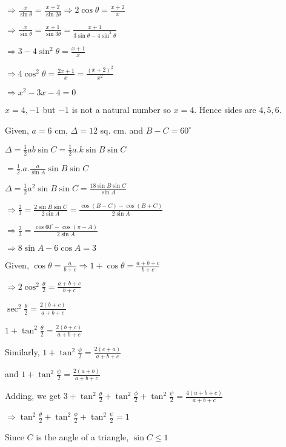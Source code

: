   $\Rightarrow \frac{x}{\sin\theta} = \frac{x + 2}{\sin2\theta} \Rightarrow 2\cos\theta = \frac{x + 2}{x}$

  $\Rightarrow \frac{x}{\sin\theta} = \frac{x + 1}{\sin3\theta} = \frac{x + 1}{3\sin\theta - 4\sin^2\theta}$

  $\Rightarrow 3 - 4\sin^2\theta = \frac{x + 1}{x}$

  $\Rightarrow 4\cos^2\theta = \frac{2x + 1}{x} = \frac{(x + 2)^2}{x^2}$

  $\Rightarrow x^2 - 3x - 4 = 0$

  $x = 4, -1$ but $-1$ is not a natural number so $x = 4.$ Hence sides are $4,5,6.$

\item Given, $a = 6$ cm, $\Delta = 12$ sq. cm. and $B - C = 60^\circ$

  $\Delta = \frac{1}{2}ab\sin C = \frac{1}{2}a.k\sin B\sin C$

  $= \frac{1}{2}.a.\frac{a}{\sin A}\sin B\sin C$

  $\Delta = \frac{1}{2}a^2\sin B\sin C = \frac{18\sin B\sin C}{\sin A}$

  $\Rightarrow \frac{2}{3} = \frac{2\sin B\sin C}{2\sin A} = \frac{\cos(B - C) - \cos(B + C)}{2\sin A}$

  $\Rightarrow \frac{2}{3} = \frac{\cos60^\circ - \cos(\pi - A)}{2\sin A}$

  $\Rightarrow 8\sin A - 6\cos A = 3$

\item Given, $\cos\theta = \frac{a}{b + c} \Rightarrow 1 + \cos\theta = \frac{a + b + c}{b + c}$

  $\Rightarrow 2\cos^2\frac{\theta}{2} = \frac{a + b + c}{b + c}$

  $\sec^2\frac{\theta}{2} = \frac{2(b + c)}{a + b + c}$

  $1 + \tan^2\frac{\theta}{2} = \frac{2(b + c)}{a + b + c}$

  Similarly, $1 + \tan^2\frac{\phi}{2} = \frac{2(c + a)}{a + b + c}$

  and $1 + \tan^2\frac{\psi}{2} = \frac{2(a + b)}{a + b + c}$

  Adding, we get $3 + \tan^2\frac{\theta}{2} + \tan^2\frac{\phi}{2} + \tan^2\frac{\psi}{2} = \frac{4(a + b + c)}{a + b +
    c}$

  $\Rightarrow \tan^2\frac{\theta}{2} + \tan^2\frac{\phi}{2} + \tan^2\frac{\psi}{2} = 1$

\item Since $C$ is the angle of a triangle, $\sin C\leq 1$

